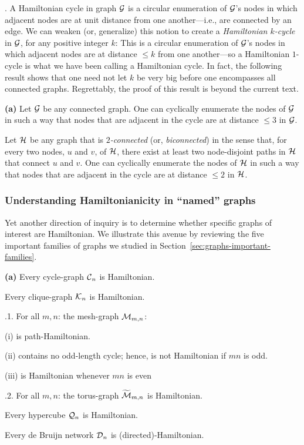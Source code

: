 .
A Hamiltonian cycle in graph $\mbox{$\cal G$}$ is a circular enumeration of $\mbox{$\cal G$}$'s
nodes in which adjacent nodes are at unit distance from one
another---i.e., are connected by an edge.  We can weaken (or,
generalize) this notion to create a {\it Hamiltonian $k$-cycle}
 in $\mbox{$\cal G$}$, for any positive integer
$k$: This is a circular enumeration of $\mbox{$\cal G$}$'s nodes in which adjacent
nodes are at distance $\leq k$ from one another---so a Hamiltonian
$1$-cycle is what we have been calling a Hamiltonian cycle.  In fact,
the following result shows that one need not let $k$ be very big
before one encompasses all connected graphs.  Regrettably, the proof
of this result is beyond the current text.

\begin{prop}
\label{thm:weak-Hamiltonianicity}
{\bf (a)} {\rm \cite{ChartrandK69}}
Let $\mbox{$\cal G$}$ be any connected graph.  One can cyclically enumerate the
nodes of $\mbox{$\cal G$}$ in such a way that nodes that are adjacent in the cycle
are at distance $\leq 3$ in $\mbox{$\cal G$}$.


 {\rm  \cite{Fleischner74}}
Let $\mbox{$\cal H$}$ be any graph that is {\em $2$-connected}
  (or, {\it
  biconnected}) in the sense that, for every two nodes, $u$ and $v$,
of $\mbox{$\cal H$}$, there exist at least two node-disjoint paths in $\mbox{$\cal H$}$ that
connect $u$ and $v$.  One can cyclically enumerate the nodes of $\mbox{$\cal H$}$
in such a way that nodes that are adjacent in the cycle are at
distance $\leq 2$ in $\mbox{$\cal H$}$.
\end{prop}

\subsubsection{Understanding Hamiltonianicity in ``named'' graphs}

Yet another direction of inquiry is to determine whether specific
graphs of interest are Hamiltonian.  We illustrate this avenue by
reviewing the five important families of graphs we studied in
Section~\ref{sec:graphs-important-families}.

\begin{prop}
\label{thm:named-graph-Hamiltonian}
{\bf (a)}
Every cycle-graph $\mbox{$\cal C$}_n$ is Hamiltonian.

Every clique-graph $\mbox{$\cal K$}_n$ is Hamiltonian.

.1.
For all $m,n$: the mesh-graph $\mbox{$\cal M$}_{m,n}$:

(i)  is path-Hamiltonian.

(ii) contains no odd-length cycle; hence, is not Hamiltonian if $mn$
is odd.

(iii) is Hamiltonian whenever $mn$ is even 

.2.
For all $m,n$: the torus-graph $\widetilde{\mbox{$\cal M$}}_{m,n}$ is Hamiltonian.

Every hypercube $\mbox{$\cal Q$}_n$  is Hamiltonian.

Every de Bruijn network $\mbox{$\cal D$}_n$ is (directed)-Hamiltonian.
\end{prop}

